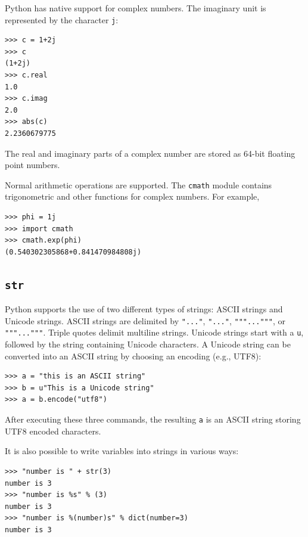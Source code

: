 \documentclass[justified, sixbynine]{tufte-book}
\def\ft{\small\tt}
\theoremstyle{plain}%
\newtheorem * {corollary}{Corollary}
\theoremstyle{definition}
\theoremstyle{remark}
\newtheorem * {remark}{Remark}
\newtheorem * {note}{Note}
\begin{document}
\begin{fullwidth}

Python has native support for complex numbers. The imaginary unit is represented by the character {\ft j}:

\begin{lstlisting}
>>> c = 1+2j
>>> c
(1+2j)
>>> c.real
1.0
>>> c.imag
2.0
>>> abs(c)
2.2360679775
\end{lstlisting}

The real and imaginary parts of a complex number are stored as 64-bit floating point numbers.

Normal arithmetic operations are supported. The {\ft cmath} module contains trigonometric and other functions for complex numbers. For example, 

\begin{lstlisting}
>>> phi = 1j
>>> import cmath
>>> cmath.exp(phi)
(0.540302305868+0.841470984808j)
\end{lstlisting}


\goodbreak\subsection{{\ft str}}

    

Python supports the use of two different types of strings: ASCII strings and Unicode strings. ASCII strings are delimited by {\ft "..."}, {\ft "..."}, {\ft """..."""}, or {\ft """..."""}. Triple quotes delimit multiline strings. Unicode strings start with a {\ft u}, followed by the string containing Unicode characters. A Unicode string can be converted into an ASCII string by choosing an encoding (e.g., UTF8):

\begin{lstlisting}
>>> a = "this is an ASCII string"
>>> b = u"This is a Unicode string"
>>> a = b.encode("utf8")
\end{lstlisting}

After executing these three commands, the resulting {\ft a} is an ASCII string storing UTF8 encoded characters.

It is also possible to write variables into strings in various ways:

\begin{lstlisting}
>>> "number is " + str(3)
number is 3
>>> "number is %s" % (3)
number is 3
>>> "number is %(number)s" % dict(number=3)
number is 3
\end{lstlisting}


\end{fullwidth}
\end{document}
